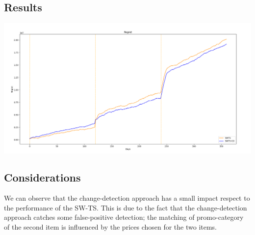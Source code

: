 \subsection*{Results}
\begin{center}
	\includegraphics[scale=0.35]{Images/n8}
\end{center}
\subsection*{Considerations}
We can observe that the change-detection approach has a small impact respect to the performance of the SW-TS. This is due to the fact that the change-detection approach catches some false-positive detection; the matching of promo-category of the second item is influenced by the prices chosen for the two items.
